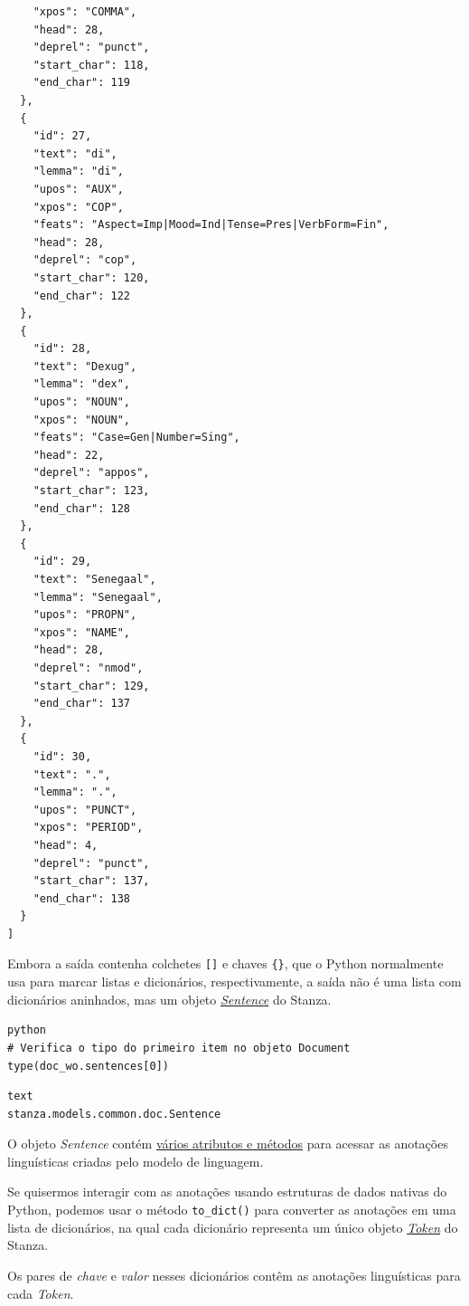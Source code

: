 \documentclass[
  brazilian,
]{article}
\begin{document}
\begin{verbatim}
    "xpos": "COMMA",
    "head": 28,
    "deprel": "punct",
    "start_char": 118,
    "end_char": 119
  },
  {
    "id": 27,
    "text": "di",
    "lemma": "di",
    "upos": "AUX",
    "xpos": "COP",
    "feats": "Aspect=Imp|Mood=Ind|Tense=Pres|VerbForm=Fin",
    "head": 28,
    "deprel": "cop",
    "start_char": 120,
    "end_char": 122
  },
  {
    "id": 28,
    "text": "Dexug",
    "lemma": "dex",
    "upos": "NOUN",
    "xpos": "NOUN",
    "feats": "Case=Gen|Number=Sing",
    "head": 22,
    "deprel": "appos",
    "start_char": 123,
    "end_char": 128
  },
  {
    "id": 29,
    "text": "Senegaal",
    "lemma": "Senegaal",
    "upos": "PROPN",
    "xpos": "NAME",
    "head": 28,
    "deprel": "nmod",
    "start_char": 129,
    "end_char": 137
  },
  {
    "id": 30,
    "text": ".",
    "lemma": ".",
    "upos": "PUNCT",
    "xpos": "PERIOD",
    "head": 4,
    "deprel": "punct",
    "start_char": 137,
    "end_char": 138
  }
]
\end{verbatim}

Embora a saída contenha colchetes \texttt{{[}{]}} e chaves
\texttt{\{\}}, que o Python normalmente usa para marcar listas e
dicionários, respectivamente, a saída não é uma lista com dicionários
aninhados, mas um objeto
\href{https://stanfordnlp.github.io/stanza/data_objects.html\#sentence}{\emph{Sentence}}
do Stanza.

\begin{verbatim}
python
# Verifica o tipo do primeiro item no objeto Document
type(doc_wo.sentences[0])
\end{verbatim}

\begin{verbatim}
text
stanza.models.common.doc.Sentence
\end{verbatim}

O objeto \emph{Sentence} contém
\href{https://stanfordnlp.github.io/stanza/data_objects.html\#sentence}{vários
atributos e métodos} para acessar as anotações linguísticas criadas pelo
modelo de linguagem.

Se quisermos interagir com as anotações usando estruturas de dados
nativas do Python, podemos usar o método \texttt{to\_dict()} para
converter as anotações em uma lista de dicionários, na qual cada
dicionário representa um único objeto
\href{https://stanfordnlp.github.io/stanza/data_objects.html\#token}{\emph{Token}}
do Stanza.

Os pares de \emph{chave} e \emph{valor} nesses dicionários contêm as
anotações linguísticas para cada \emph{Token}.
\end{document}
